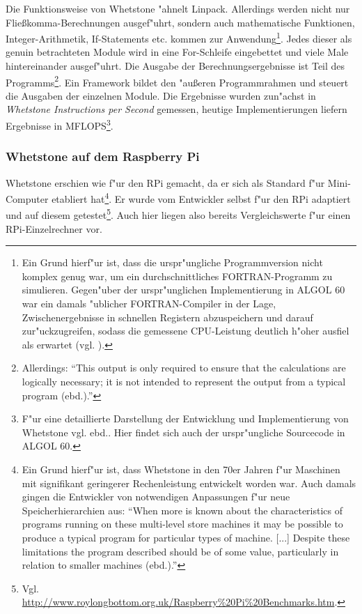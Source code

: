 Die Funktionsweise von Whetstone "ahnelt Linpack. Allerdings werden nicht nur Flie\ss komma-Berechnungen ausgef"uhrt, sondern auch mathematische Funktionen, Integer-Arithmetik, If-Statements etc. kommen zur Anwendung\footnote{Ein Grund hierf"ur ist, dass die urspr"ungliche Programmversion nicht komplex genug war, um ein durchschnittliches FORTRAN-Programm zu simulieren. Gegen"uber der urspr"unglichen Implementierung in ALGOL 60 war ein damals "ublicher FORTRAN-Compiler in der Lage, Zwischenergebnisse in schnellen Registern abzuspeichern und darauf zur"uckzugreifen, sodass die gemessene CPU-Leistung deutlich h"oher ausfiel als erwartet (vgl. \cite{cur76}).}. Jedes dieser als genuin betrachteten Module wird in eine For-Schleife eingebettet und viele Male  hintereinander ausgef"uhrt. Die Ausgabe der Berechnungsergebnisse ist Teil des Programms\footnote{Allerdings: "`This output is only required to ensure that the calculations are logically necessary; it is not intended to represent the output from a typical program (ebd.)."'}. Ein Framework bildet den "au\ss eren Programmrahmen und steuert die Ausgaben der einzelnen Module. Die Ergebnisse wurden zun"achst in \textit{Whetstone Instructions per Second} gemessen, heutige Implementierungen liefern Ergebnisse in MFLOPS\footnote{F"ur eine detaillierte Darstellung der Entwicklung und Implementierung von Whetstone vgl. ebd.. Hier findet sich auch der urspr"ungliche Sourcecode in ALGOL 60.}. 

\subsubsection{Whetstone auf dem Raspberry Pi}\label{Whetstone RPi}

Whetstone erschien wie f"ur den RPi gemacht, da er sich als Standard f"ur Mini-Computer etabliert hat\footnote{Ein Grund hierf"ur ist, dass Whetstone in den 70er Jahren f"ur Maschinen mit signifikant geringerer Rechenleistung entwickelt worden war. Auch damals gingen die Entwickler von notwendigen Anpassungen f"ur neue Speicherhierarchien aus: "`When more is known about the characteristics of programs running on these multi-level store machines it may be possible to produce a typical program for particular types of machine. [...] Despite these limitations the program described should be of some value, particularly in relation to smaller machines (ebd.)."'}. Er wurde vom Entwickler selbst f"ur den RPi adaptiert und auf diesem getestet\footnote{Vgl. \url{http://www.roylongbottom.org.uk/Raspberry\%20Pi\%20Benchmarks.htm}.}. Auch hier liegen also bereits Vergleichswerte f"ur einen RPi-Einzelrechner vor. 

